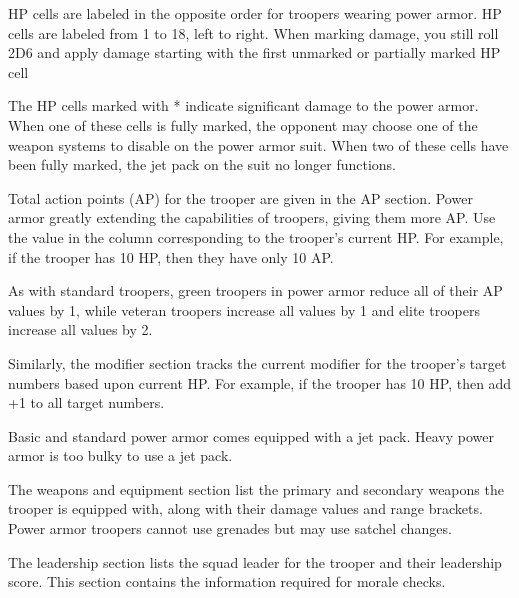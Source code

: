 HP cells are labeled in the opposite order for troopers wearing power armor.
HP cells are labeled from 1 to 18, left to right.
When marking damage, you still roll 2D6 and apply damage starting with the first unmarked or partially marked HP cell

The HP cells marked with * indicate significant damage to the power armor.
When one of these cells is fully marked, the opponent may choose one of the weapon systems to disable on the power armor suit.
When two of these cells have been fully marked, the jet pack on the suit no longer functions.

Total action points (AP) for the trooper are given in the AP section.
Power armor greatly extending the capabilities of troopers, giving them more AP.
Use the value in the column corresponding to the trooper's current HP.
For example, if the trooper has 10 HP, then they have only 10 AP.

As with standard troopers, green troopers in power armor reduce all of their AP values by 1, while veteran troopers increase all values by 1 and elite troopers increase all values by 2.

Similarly, the modifier section tracks the current modifier for the trooper's target numbers based upon current HP.
For example, if the trooper has 10 HP, then add +1 to all target numbers.

Basic and standard power armor comes equipped with a jet pack.
Heavy power armor is too bulky to use a jet pack.

The weapons and equipment section list the primary and secondary weapons the trooper is equipped with, along with their damage values and range brackets.
Power armor troopers cannot use grenades but may use satchel changes.

The leadership section lists the squad leader for the trooper and their leadership score.
This section contains the information required for morale checks.

